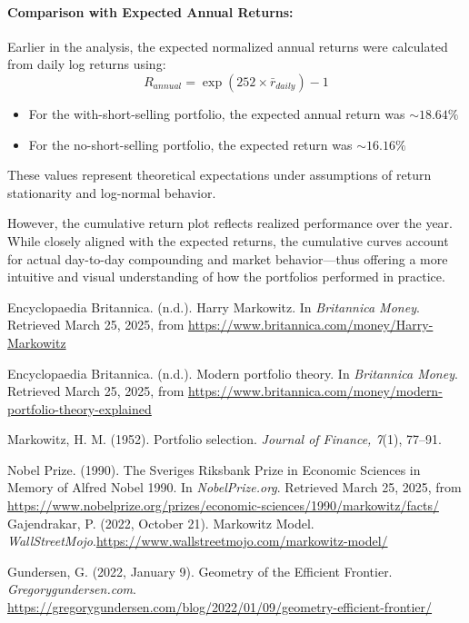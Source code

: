 \documentclass[12pt]{article}
\begin{document}
\paragraph{Comparison with Expected Annual Returns:}
Earlier in the analysis, the expected normalized annual returns were calculated from daily log returns using:
\[R_{annual}=\exp(252\times \bar{r}_{daily})-1\]
\begin{itemize}
    \item For the with-short-selling portfolio, the expected annual return was $\sim 18.64\%$
    \item For the no-short-selling portfolio, the expected return was $\sim 16.16\%$
\end{itemize}
These values represent theoretical expectations under assumptions of return stationarity and log-normal behavior.\par
However, the cumulative return plot reflects realized performance over the year. While closely aligned with the expected returns, the cumulative curves account for actual day-to-day compounding and market behavior—thus offering a more intuitive and visual understanding of how the portfolios performed in practice.





\begin{spacing}{1.5}
\begin{thebibliography}{9}

Encyclopaedia Britannica. (n.d.). Harry Markowitz. In \textit{Britannica Money}. Retrieved March 25, 2025, from \url{https://www.britannica.com/money/Harry-Markowitz}

Encyclopaedia Britannica. (n.d.). Modern portfolio theory. In \textit{Britannica Money}. Retrieved March 25, 2025, from \url{https://www.britannica.com/money/modern-portfolio-theory-explained}

Markowitz, H. M. (1952). Portfolio selection. \textit{Journal of Finance, 7}(1), 77--91.

Nobel Prize. (1990). The Sveriges Riksbank Prize in Economic Sciences in Memory of Alfred Nobel 1990. In \textit{NobelPrize.org}. Retrieved March 25, 2025, from \url{https://www.nobelprize.org/prizes/economic-sciences/1990/markowitz/facts/}
Gajendrakar, P. (2022, October 21). Markowitz Model. \textit{WallStreetMojo}.\url{https://www.wallstreetmojo.com/markowitz-model/}

Gundersen, G. (2022, January 9). Geometry of the Efficient Frontier. \textit{Gregorygundersen.com}.\url{ https://gregorygundersen.com/blog/2022/01/09/geometry-efficient-frontier/}

\end{thebibliography}
\end{spacing}
\end{document}
